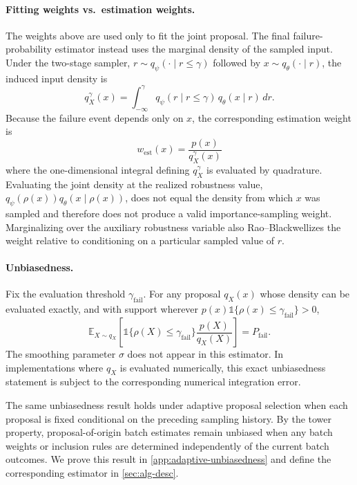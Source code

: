 \documentclass[twoside,11pt]{article}
\begin{document}
\paragraph{Fitting weights vs.\ estimation weights.}
The weights above are used only to fit the joint proposal. The final failure-probability estimator instead uses the marginal density of the sampled input. Under the two-stage sampler, $r \sim q_\psi(\cdot \mid r \leq \gamma)$ followed by $x \sim q_\theta(\cdot \mid r)$, the induced input density is
\begin{equation*}
    q_X^\gamma(x)
    =
    \int_{-\infty}^{\gamma}
    q_\psi(r \mid r \leq \gamma)\,
    q_\theta(x \mid r)\,dr.
\end{equation*}
Because the failure event depends only on $x$, the corresponding estimation weight is
\begin{equation*}
    w_{\mathrm{est}}(x)
    =
    \frac{p(x)}{q_X^\gamma(x)}
\end{equation*}
where the one-dimensional integral defining $q_X^\gamma$ is evaluated by quadrature. Evaluating the joint density at the realized robustness value, $q_\psi(\rho(x))q_\theta(x\mid\rho(x))$, does not equal the density from which $x$ was sampled and therefore does not produce a valid importance-sampling weight. Marginalizing over the auxiliary robustness variable also Rao--Blackwellizes the weight relative to conditioning on a particular sampled value of $r$.

\paragraph{Unbiasedness.}
Fix the evaluation threshold $\gamma_{\mathrm{fail}}$. For any proposal $q_X(x)$ whose density can be evaluated exactly, and with support wherever $p(x)\mathds{1}\{\rho(x)\leq\gamma_{\mathrm{fail}}\}>0$,
\[
    \mathbb{E}_{X\sim q_X}
    \left[
        \mathds{1}\{\rho(X)\leq\gamma_{\mathrm{fail}}\}
        \frac{p(X)}{q_X(X)}
    \right]
    =
    P_{\mathrm{fail}}.
\]
The smoothing parameter $\sigma$ does not appear in this estimator. In implementations where $q_X$ is evaluated numerically, this exact unbiasedness statement is subject to the corresponding numerical integration error.

The same unbiasedness result holds under adaptive proposal selection when each proposal is fixed conditional on the preceding sampling history. By the tower property, proposal-of-origin batch estimates remain unbiased when any batch weights or inclusion rules are determined independently of the current batch outcomes. We prove this result in \cref{app:adaptive-unbiasedness} and define the corresponding estimator in \cref{sec:alg-desc}.
\end{document}
